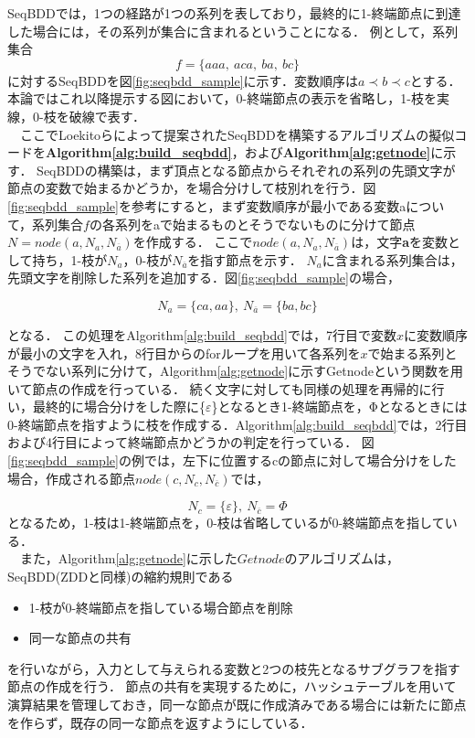 \documentclass[12pt,twoside, fleqn]{ujbook}
\begin{document}
	\newpage
	SeqBDDでは，1つの経路が1つの系列を表しており，最終的に1-終端節点に到達した場合には，その系列が集合に含まれるということになる．
	例として，系列集合
	$$f = \{aaa,\ aca,\ ba,\ bc\}$$
	に対するSeqBDDを図\ref{fig:seqbdd_sample}に示す．変数順序は$a\prec b\prec c$とする．本論ではこれ以降提示する図において，0-終端節点の表示を省略し，1-枝を実線，0-枝を破線で表す．\\
	　ここでLoekitoら\cite{Loekito:2010:BDD:1851388.1851396}によって提案されたSeqBDDを構築するアルゴリズムの擬似コードを{\bf Algorithm\ref{alg:build_seqbdd}}，および{\bf Algorithm\ref{alg:getnode}}に示す．
	SeqBDDの構築は，まず頂点となる節点からそれぞれの系列の先頭文字が節点の変数で始まるかどうか，を場合分けして枝別れを行う．図\ref{fig:seqbdd_sample}を参考にすると，まず変数順序が最小である変数aについて，系列集合$f$の各系列をaで始まるものとそうでないものに分けて節点$N=node(a,N_{a},N_{\overline{a}})$を作成する．
	ここで$node(a,N_{a},N_{\overline{a}})$は，文字{\bf a}を変数として持ち，1-枝が$N_{a}$，0-枝が$N_{\overline{a}}$を指す節点を示す．
	$N_{a}$に含まれる系列集合は，先頭文字を削除した系列を追加する．図\ref{fig:seqbdd_sample}の場合，
	
	$$
	N_{a}=\{ca,aa\},\ N_{\overline{a}}=\{ba, bc\}
	$$
	
	となる．
	この処理をAlgorithm\ref{alg:build_seqbdd}では，7行目で変数$x$に変数順序が最小の文字を入れ，8行目からのforループを用いて各系列を$x$で始まる系列とそうでない系列に分けて，Algorithm\ref{alg:getnode}に示すGetnodeという関数を用いて節点の作成を行っている．
	続く文字に対しても同様の処理を再帰的に行い，最終的に場合分けをした際に\{$\varepsilon$\}となるとき1-終端節点を，Φとなるときには0-終端節点を指すように枝を作成する．Algorithm\ref{alg:build_seqbdd}では，2行目および4行目によって終端節点かどうかの判定を行っている．
	図\ref{fig:seqbdd_sample}の例では，左下に位置するcの節点に対して場合分けをした場合，作成される節点$node(c,N_{c},N_{\overline{c}})$では，
	
	$$
	N_{c}=\{\varepsilon\},\ N_{\overline{c}}=\Phi
	$$
	となるため，1-枝は1-終端節点を，0-枝は省略しているが0-終端節点を指している．\\

	　また，Algorithm\ref{alg:getnode}に示した$Getnode$のアルゴリズムは，SeqBDD(ZDDと同様)の縮約規則である
	\begin{itemize}
	\item 1-枝が0-終端節点を指している場合節点を削除
	\item 同一な節点の共有
	\end{itemize}
	を行いながら，入力として与えられる変数と2つの枝先となるサブグラフを指す節点の作成を行う．
	節点の共有を実現するために，ハッシュテーブルを用いて演算結果を管理しておき，同一な節点が既に作成済みである場合には新たに節点を作らず，既存の同一な節点を返すようにしている．
\end{document}
